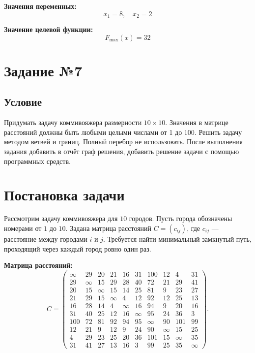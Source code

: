 \documentclass{article}
\begin{document}
\textbf{Значения переменных:}
\[
    x_1 = 8, \quad x_2 = 2
\]

\textbf{Значение целевой функции:}
\[
    F_{\max}(x) = 32
\]

\section{Задание №7}
\subsection{Условие}
Придумать задачу коммивояжера размерности $10 \times 10$. Значения в матрице расстояний должны быть любыми целыми числами от 1 до 100.
Решить задачу методом ветвей и границ. Полный перебор не использовать.
После выполнения задания добавить в отчёт граф решения, добавить решение задачи с помощью программных средств.

\section*{Постановка задачи}

Рассмотрим задачу коммивояжера для $10$ городов. Пусть города обозначены номерами от $1$ до $10$. Задана матрица расстояний $C = (c_{ij})$, где $c_{ij}$ — расстояние между городами $i$ и $j$. Требуется найти минимальный замкнутый путь, проходящий через каждый город ровно один раз.

\textbf{Матрица расстояний:}
\[
    C = \begin{pmatrix}
        \infty & 29     & 20     & 21     & 16     & 31     & 100    & 12     & 4      & 31     \\
        29     & \infty & 15     & 29     & 28     & 40     & 72     & 21     & 29     & 41     \\
        20     & 15     & \infty & 15     & 14     & 25     & 81     & 9      & 23     & 27     \\
        21     & 29     & 15     & \infty & 4      & 12     & 92     & 12     & 25     & 13     \\
        16     & 28     & 14     & 4      & \infty & 16     & 94     & 9      & 20     & 16     \\
        31     & 40     & 25     & 12     & 16     & \infty & 95     & 24     & 36     & 3      \\
        100    & 72     & 81     & 92     & 94     & 95     & \infty & 90     & 101    & 99     \\
        12     & 21     & 9      & 12     & 9      & 24     & 90     & \infty & 15     & 25     \\
        4      & 29     & 23     & 25     & 20     & 36     & 101    & 15     & \infty & 35     \\
        31     & 41     & 27     & 13     & 16     & 3      & 99     & 25     & 35     & \infty
    \end{pmatrix}.
\]
\end{document}
